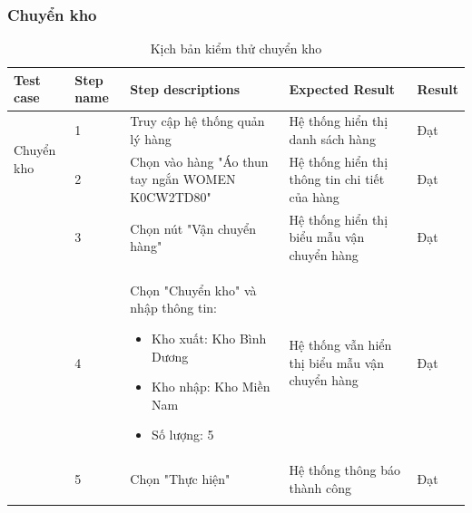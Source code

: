 \subsubsection{Chuyển kho}
{
    \setlength\extrarowheight{6pt}
    \begin{longtable}{| p{2.5cm}| p{1cm}| p{5.5cm}| p{4.5cm} | p{1.5cm} |}
        \hline
        \textbf{Test case}                 & \textbf{Step name}                             & \textbf{Step descriptions}                       & \textbf{Expected Result}                      & \textbf{Result} \\
        \hline
        \multirow[t]{2}{2.5cm}{Chuyển kho} & 1                                              & Truy cập hệ thống quản lý hàng                   & Hệ thống hiển thị danh sách hàng              & Đạt             \\
        \cline{2-5}
                                           & 2                                              & Chọn vào hàng "Áo thun tay ngắn WOMEN K0CW2TD80" & Hệ thống hiển thị thông tin chi tiết của hàng & Đạt             \\
        \cline{2-5}
                                           & 3                                              & Chọn nút "Vận chuyển hàng"                       & Hệ thống hiển thị biểu mẫu vận chuyển hàng    & Đạt             \\
        \cline{2-5}
                                           & 4                                              & Chọn "Chuyển kho" và nhập thông tin:
        \begin{itemize}
            \item Kho xuất: Kho Bình Dương
            \item Kho nhập: Kho Miền Nam
            \item Số lượng: 5
        \end{itemize}
                                           & Hệ thống vẫn hiển thị biểu mẫu vận chuyển hàng & Đạt                                                                                                                \\
        \cline{2-5}
                                           & 5                                              & Chọn "Thực hiện"                                 & Hệ thống thông báo thành công                 & Đạt             \\
        \hline
        \caption{Kịch bản kiểm thử chuyển kho}
    \end{longtable}
}

